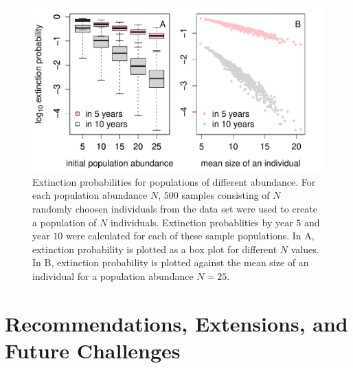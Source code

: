 \documentclass[12pt]{amsart}\usepackage[]{graphicx}\usepackage[]{color}
\makeatletter
\def\maxwidth{ %
  \ifdim\Gin@nat@width>\linewidth
    \linewidth
  \else
    \Gin@nat@width
  \fi
}
\newenvironment{knitrout}{}{} %
\makeatother
\begin{document}
\begin{knitrout}
\color{fgcolor}\begin{figure}
\includegraphics[width=\maxwidth]{figure/sampling-1} \caption[Extinction probabilities for populations of different abundance]{Extinction probabilities for populations of different abundance. For each population abundance $N$, $500$ samples consisting of $N$ randomly choosen individuals from the data set were used to create a population of $N$ individuals. Extinction probablities by year $5$ and year $10$ were calculated for each of these sample populations. In A, extinction probability is plotted as a box plot for different $N$ values. In B, extinction probability is plotted against the mean size of an individual for a population abundance $N=25$.}\label{fig:sampling}
\end{figure}


\end{knitrout}

\section*{Recommendations, Extensions, and Future Challenges}
\end{document}
